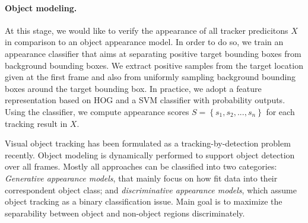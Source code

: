 \paragraph{Object modeling.}
At this stage, we would like to verify the appearance of all tracker
predicitons $X$ in comparison to an object appearance model.
In order to do so, we train an appearance classifier that aims at separating
positive target bounding boxes from background bounding boxes.
We extract positive samples from the target location given at the first frame
and also from uniformly sampling background bounding boxes around the target
bounding box.
In practice, we adopt a feature representation based on HOG and a SVM
classifier with probability outputs.
Using the classifier, we compute appearance scores  
$S = \left \{ s_1, s_2, ..., s_n \right \}$ for each tracking result in $X$.


\iffalse
Visual object tracking has been formulated as a tracking-by-detection problem
recently. Object modeling is dynamically performed to support object detection
over all frames. Mostly all approaches can be classified into two categories:
\textit{Generative appearance models}, that mainly focus on how fit data into
their correspondent object class; and \textit{discriminative appearance models},
which assume object tracking as a binary classification issue. Main goal is to
maximize the separability between object and non-object regions discriminately.

